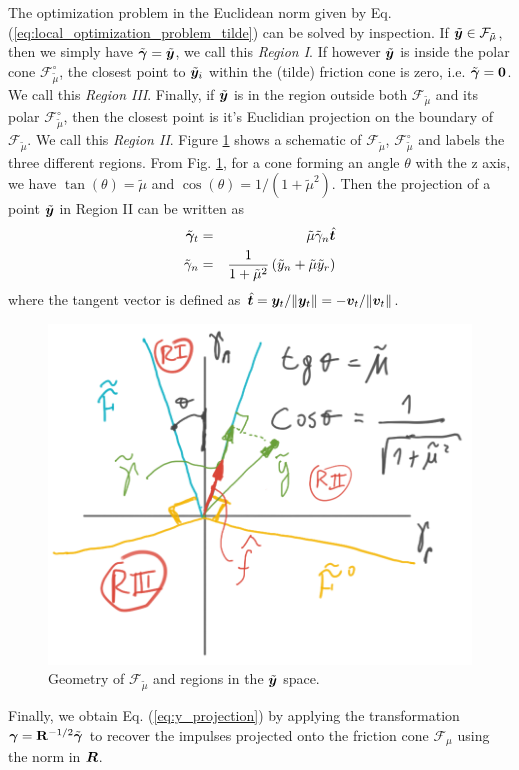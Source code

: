 The optimization problem in the Euclidean norm given by Eq.
(\ref{eq:local_optimization_problem_tilde}) can be solved by inspection. If
$\tilde{{\bm{y}}}\in\mathcal{F}_{\tilde\mu}$, then we simply have $\tilde{{\bm\gamma}}
= \tilde{{\bm{y}}}$, we call this \textit{Region I}. If however $\tilde{{\bm{y}}}$
is inside the polar cone $\mathcal{F}_{\tilde\mu}^\circ$, the closest point to
$\tilde{{\bm{y}}}_i$ within the (tilde) friction cone is zero, i.e.
$\tilde{{\bm\gamma}} ={\bm{0}}$. We call this \textit{Region III}. Finally, if
$\tilde{{\bm{y}}}$ is in the region outside both $\mathcal{F}_{\tilde\mu}$ and its
polar $\mathcal{F}_{\tilde\mu}^\circ$, then the closest point is it's Euclidian
projection on the boundary of $\mathcal{F}_{\tilde\mu}$. We call this
\textit{Region II}. Figure \ref{fig:cone_regions} shows a schematic of
$\mathcal{F}_{\tilde\mu}$, $\mathcal{F}_{\tilde\mu}^\circ$ and labels the three
different regions. From Fig. \ref{fig:cone_regions}, for a cone forming an angle
$\theta$ with the z axis, we have $\tan(\theta)=\tilde\mu$ and
$\cos(\theta)=1/(1+\tilde\mu^2)$. Then the projection of a point
$\tilde{{\bm{y}}}$ in Region II can be written as
\begin{eqnarray}
	\tilde{{\bm\gamma}}_t &=& \tilde{\mu}\tilde{\gamma}_n\hat{{\bm{t}}}\nonumber\\
	\tilde{\gamma}_n &=& \frac{1}{1+\tilde{\mu}^2}\left(\tilde{y}_n +
	\tilde{\mu}\tilde{y}_r\right)\nonumber		
\end{eqnarray}
where the tangent vector is defined as
$\hat{{\bm{t}}}={\bm{y}}_t/\Vert{\bm{y}}_t\Vert=-{\bm{v}}_t/\Vert{\bm{v}}_t\Vert$. 
\begin{figure}[!h]
    \centering
    \includegraphics[width=0.45\columnwidth]{figures/cone_regions.png}
    \caption{Geometry of $\mathcal{F}_{\tilde\mu}$ and regions in the
    $\tilde{{\bm{y}}}$ space.}
    \label{fig:cone_regions}
\end{figure}

Finally, we obtain Eq. (\ref{eq:y_projection}) by applying the transformation
${\bm\gamma}={\mathbf{R}}^{-1/2}\tilde{{\bm\gamma}}$ to recover the impulses projected onto the
friction cone ${\mathcal{F}}_{\mu}$ using the norm in ${\bm{R}}$.

